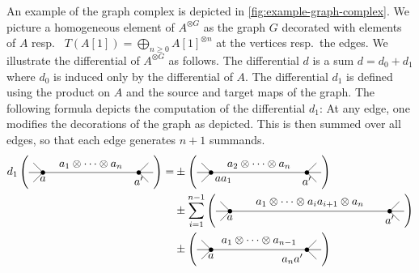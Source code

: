 \documentclass{scrartcl}
\theoremstyle{plain}
\theoremstyle{definition}
\begin{document}
An example of the graph complex is depicted in \cref{fig:example-graph-complex}. We picture a homogeneous element of $A^{\otimes G}$ as the graph $G$ decorated with elements of $A$ resp.~ $T(A[1])=\bigoplus_{n\geq 0} A[1]^{\otimes n}$ at the vertices resp.~the edges.
We illustrate the differential of $A^{\otimes G}$ as follows. The differential $d$ is a sum $d=d_0+d_1$ where $d_0$ is induced only by the differential of $A$. The differential $d_1$ is defined using the product on $A$ and the source and target maps of the graph. The following formula depicts the computation of the differential $d_1$: At any edge, one modifies the decorations of the graph as depicted. This is then summed over all edges, so that each edge generates $n+1$ summands. 
\begin{align*}
    d_1\left(
        \tikz[baseline=-.5ex]{
        \fill (0, 0) circle (2pt) node[anchor=north] {$a$};
        \fill (3, 0) circle (2pt) node[anchor=north] {$a'$};
        \draw (0,0) -- (3,0) ;
        \draw (1.5, 0) node[anchor=south]{$a_1\otimes\dots\otimes a_n$};
        \draw (0,0) -- (-0.3, -0.3);
        \draw (0,0) -- (-0.44, 0);
        \draw (0,0) -- (-0.3, 0.3);
        \draw (3,0) -- (3.3, -0.3);
        \draw (3,0) -- (3.45, 0);
        \draw (3,0) -- (3.3, 0.3);
    }\right) = 
    &\pm
    \left(
        \tikz[baseline=-.5ex]{
        \fill (0, 0) circle (2pt) node[anchor=north west] {$a a_1$};
        \fill (3, 0) circle (2pt) node[anchor=north] {$a'$};
        \draw (0,0) -- (3,0) ;
        \draw (1.5, 0) node[anchor=south]{$a_2\otimes\dots\otimes a_n$};
        \draw (0,0) -- (-0.3, -0.3);
        \draw (0,0) -- (-0.44, 0);
        \draw (0,0) -- (-0.3, 0.3);
        \draw (3,0) -- (3.3, -0.3);
        \draw (3,0) -- (3.45, 0);
        \draw (3,0) -- (3.3, 0.3);
    }\right)\\
    &\pm
    \sum_{i=1}^{n-1}
    \left(
        \tikz[baseline=-.5ex]{
        \fill (0, 0) circle (2pt) node[anchor=north] {$a$};
        \fill (5, 0) circle (2pt) node[anchor=north] {$a'$};
        \draw (0,0) -- (5,0) ;
        \draw (2.5, 0) node[anchor=south]{$a_1\otimes\dots\otimes a_ia_{i+1}\otimes a_n$};
        \draw (0,0) -- (-0.3, -0.3);
        \draw (0,0) -- (-0.44, 0);
        \draw (0,0) -- (-0.3, 0.3);
        \draw (5,0) -- (5.3, -0.3);
        \draw (5,0) -- (5.45, 0);
        \draw (5,0) -- (5.3, 0.3);
    }\right)\\
    &\pm
    \left(
        \tikz[baseline=-.5ex]{
        \fill (0, 0) circle (2pt) node[anchor=north] {$a$};
        \fill (3, 0) circle (2pt) node[anchor=north east] {$a_na'$};
        \draw (0,0) -- (3,0) ;
        \draw (1.5, 0) node[anchor=south]{$a_1\otimes\dots\otimes a_{n-1}$};
        \draw (0,0) -- (-0.3, -0.3);
        \draw (0,0) -- (-0.44, 0);
        \draw (0,0) -- (-0.3, 0.3);
        \draw (3,0) -- (3.3, -0.3);
        \draw (3,0) -- (3.45, 0);
        \draw (3,0) -- (3.3, 0.3);
    }\right)
\end{align*}
\end{document}
